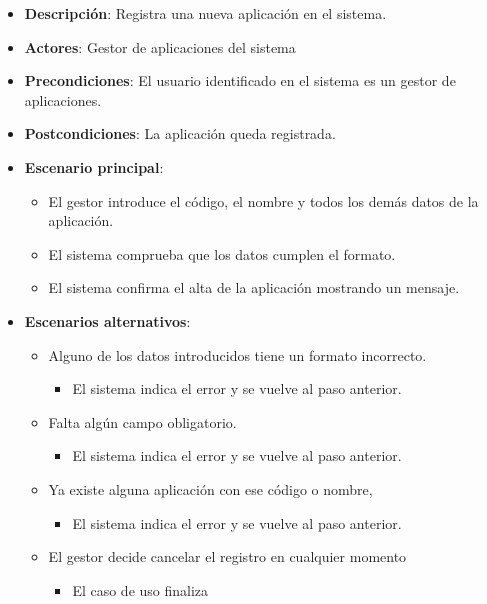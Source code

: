 \documentclass[12pt,a4paperpaper,]{report}
\providecommand{\tightlist}{%
  \setlength{\itemsep}{0pt}\setlength{\parskip}{0pt}}
\begin{document}
\begin{itemize}
\tightlist
\item
  \textbf{Descripción}: Registra una nueva aplicación en el sistema.
\item
  \textbf{Actores}: Gestor de aplicaciones del sistema
\item
  \textbf{Precondiciones}: El usuario identificado en el sistema es un
  gestor de aplicaciones.
\item
  \textbf{Postcondiciones}: La aplicación queda registrada.
\item
  \textbf{Escenario principal}:

  \begin{itemize}
  \tightlist
  \item
    El gestor introduce el código, el nombre y todos los demás datos de
    la aplicación.
  \item
    El sistema comprueba que los datos cumplen el formato.
  \item
    El sistema confirma el alta de la aplicación mostrando un mensaje.
  \end{itemize}
\item
  \textbf{Escenarios alternativos}:

  \begin{itemize}
  \tightlist
  \item
    Alguno de los datos introducidos tiene un formato incorrecto.

    \begin{itemize}
    \tightlist
    \item
      El sistema indica el error y se vuelve al paso anterior.
    \end{itemize}
  \item
    Falta algún campo obligatorio.

    \begin{itemize}
    \tightlist
    \item
      El sistema indica el error y se vuelve al paso anterior.
    \end{itemize}
  \item
    Ya existe alguna aplicación con ese código o nombre,

    \begin{itemize}
    \tightlist
    \item
      El sistema indica el error y se vuelve al paso anterior.
    \end{itemize}
  \item
    El gestor decide cancelar el registro en cualquier momento

    \begin{itemize}
    \tightlist
    \item
      El caso de uso finaliza
    \end{itemize}
  \end{itemize}
\end{itemize}
\end{document}

